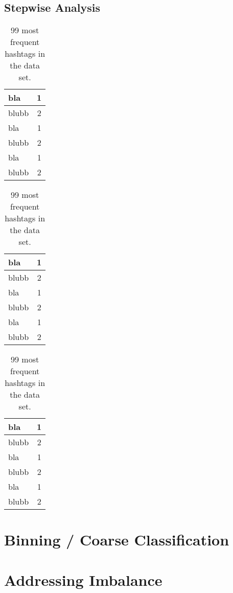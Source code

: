 \subsection{Stepwise Analysis}
        \begin{table}[H]
        	\footnotesize
        	\begin{tabular}[t]{|p{3.2cm}|c|}
        		\hline
        		bla&1\\ \hline
        		blubb&2 \\ \hline
        		bla&1\\ \hline
        		blubb&2 \\ \hline   
        		bla&1\\ \hline
        		blubb&2 \\ \hline   
        	\end{tabular}
        	\hfill
        	\begin{tabular}[t]{|p{3.2cm}|c|}
        		\hline
        		bla&1\\ \hline
        		blubb&2 \\ \hline
        		bla&1\\ \hline
        		blubb&2 \\ \hline   
        		bla&1\\ \hline
        		blubb&2 \\ \hline   
        	\end{tabular}
        	\hfill
        	\begin{tabular}[t]{|p{3.2cm}|c|}
        		\hline
        		bla&1\\ \hline
        		blubb&2 \\ \hline
        		bla&1\\ \hline
        		blubb&2 \\ \hline   
        		bla&1\\ \hline
        		blubb&2 \\ \hline   
        	\end{tabular}
        	\caption{99 most frequent hashtags in the data set.}
        \end{table}


\section{Binning / Coarse Classification}

\section{Addressing Imbalance}
